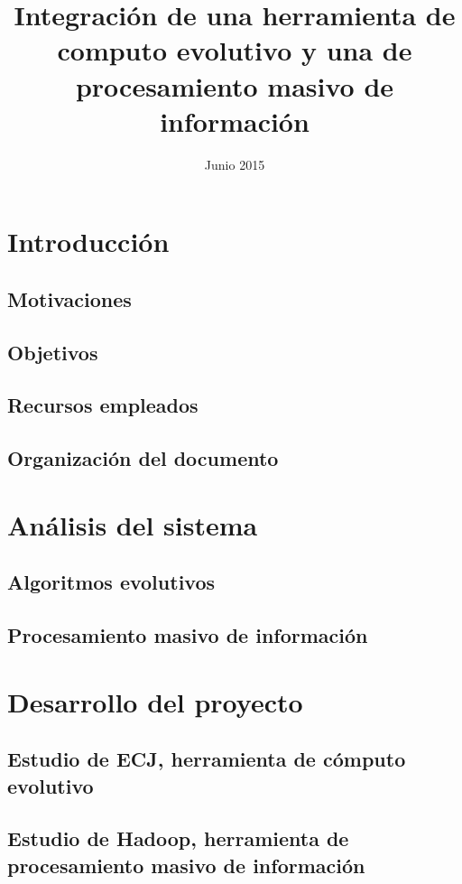 \documentclass{estilos-y-libreria}
\title{Integración de una herramienta de computo evolutivo y una de procesamiento masivo de informaci\'on}
\date{Junio 2015}
\begin{document}
\frontmatter
\hacerportada
\hacercontraportada
\newpage{\ }
\thispagestyle{empty} 
\hacerprologo
\haceragradecimientos
\setcounter{secnumdepth}{2}
\setcounter{tocdepth}{2}
\tableofcontents
\listoffigures
\listoftables

\mainmatter

\chapter{Introducci\'on}
	\section{Motivaciones\label{motivaciones}}
		
	\section{Objetivos}
	\section{Recursos empleados}
	\section{Organizaci\'on del documento}

\chapter{An\'alisis del sistema}
	
	\section{Algoritmos evolutivos}
		
	\section{Procesamiento masivo de informaci\'on}
		

\chapter{Desarrollo del proyecto}
	\section{Estudio de ECJ, herramienta de c\'omputo evolutivo\label{desarrollo-ecj}}
	\section{Estudio de Hadoop, herramienta de procesamiento masivo de informaci\'on\label{desarrollo-hadoop}}
		
\end{document}
